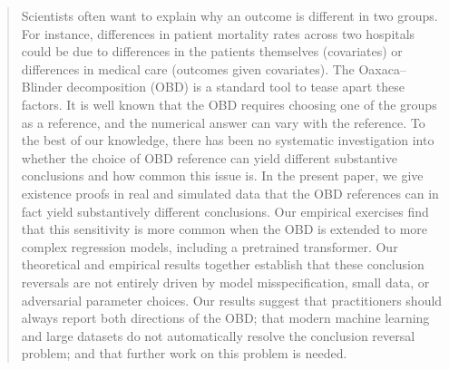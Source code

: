 \maketitle


\begin{abstract}
Scientists often want to explain why an outcome is different in two groups. For instance, differences in patient mortality rates across two hospitals could be due to differences in the patients themselves (covariates) or differences in medical care (outcomes given covariates). The Oaxaca–Blinder decomposition (OBD) is a standard tool to tease apart these factors. It is well known that the OBD requires choosing one of the groups as a reference, and the numerical answer can vary with the reference. To the best of our knowledge, there has been no systematic investigation into whether the choice of OBD reference can yield different substantive conclusions and how common this issue is. In the present paper, we give existence proofs in real and simulated data that the OBD references can in fact yield substantively different conclusions. Our empirical exercises find that this sensitivity is more common when the OBD is extended to more complex regression models, including a pretrained transformer. Our theoretical and empirical results together establish that these conclusion reversals are not entirely driven by model misspecification, small data, or adversarial parameter choices. Our results suggest that practitioners should always report both directions of the OBD; that modern machine learning and large datasets do not automatically resolve the conclusion reversal problem; and that further work on this problem is needed.
\end{abstract}







